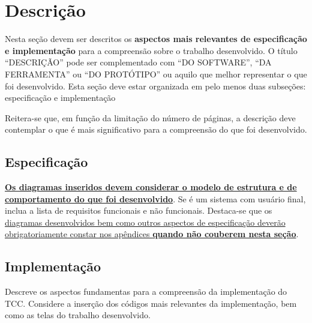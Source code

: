 \section{Descrição}\label{sec:descricao}

Nesta seção devem ser descritos os \textbf{aspectos mais relevantes de
especificação e implementação} para a compreensão sobre o trabalho
desenvolvido. O título ``DESCRIÇÃO'' pode ser complementado com ``DO
SOFTWARE'', ``DA FERRAMENTA'' ou ``DO PROTÓTIPO'' ou aquilo que melhor
representar o que foi desenvolvido. Esta seção deve estar organizada em
pelo menos duas subseções: especificação e implementação

Reitera-se que, em função da limitação do número de páginas, a descrição
deve contemplar o que é mais significativo para a compreensão do que foi
desenvolvido.

\subsection{Especificação}\label{subsec:especificacao}

\textbf{\ul{Os diagramas inseridos devem considerar o modelo de
estrutura e de comportamento do que foi desenvolvido}}. Se é um sistema
com usuário final, inclua a lista de requisitos funcionais e não
funcionais. Destaca-se que os \ul{diagramas desenvolvidos bem como
outros aspectos de especificação deverão obrigatoriamente constar nos
apêndices \textbf{quando não couberem nesta seção}}.

\subsection{Implementação}\label{subsec:implementacao}

Descreve os aspectos fundamentas para a compreensão da implementação do
TCC. Considere a inserção dos códigos mais relevantes da implementação,
bem como as telas do trabalho desenvolvido.
